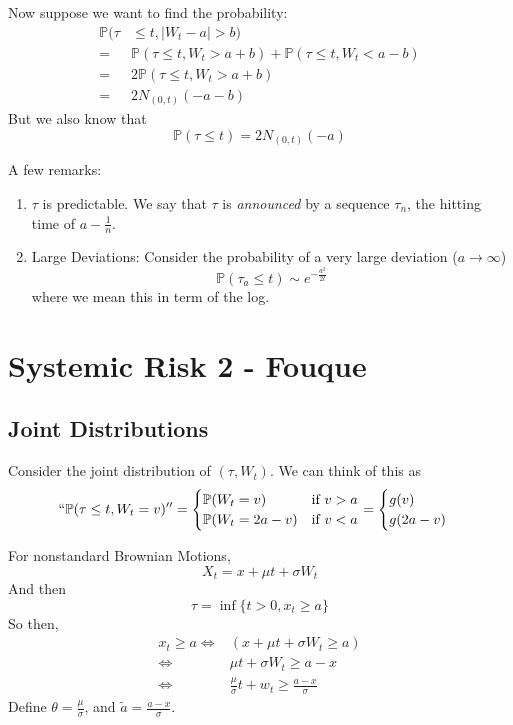 Now suppose we want to find the probability:
\begin{align}
	\mathbb{P}(\tau& \leq t, |W_t-a|> b) \\
	=& \mathbb{P}(\tau \leq t, W_t > a+b) + \mathbb{P}(\tau \leq t, W_t < a-b)\\
	=& 2\mathbb{P}(\tau \leq t, W_t > a+b)\\
	=& 2N_{(0,t)}(-a-b)
\end{align}
But we also know that
\begin{equation}
	\mathbb{P}(\tau \leq t) = 2N_{(0,t)}(-a)
\end{equation}

A few remarks:
\begin{enumerate}
	\item $\tau$ is predictable. We say that $\tau$ is \emph{announced} by a sequence $\tau_n$, the hitting time of $a-\frac1n$.
	\item Large Deviations: Consider the probability of a very large deviation ($a \to \infty$)
	\begin{equation}
		\mathbb{P}(\tau_a \leq t) \sim e^{-\frac{a^2}{2t}}
	\end{equation}
	where we mean this in term of the log.
\end{enumerate}


\chapter{Systemic Risk 2 - Fouque}
\section{Joint Distributions}
Consider the joint distribution of $(\tau,W_t)$. We can think of this as
\begin{equation}
	``\mathbb{P}(\tau\leq t, W_t = v)'' = \begin{cases}
		\mathbb{P}(W_t = v) & \text{if } v > a\\
		\mathbb{P}(W_t=2a-v) & \text{if } v < a
	\end{cases} = \begin{cases}
		g(v)\\
		g(2a-v)
	\end{cases}
\end{equation}

For nonstandard Brownian Motions,
\begin{equation}
	X_t = x + \mu t + \sigma W_t
\end{equation}
And then
\begin{equation}
	\tau = \inf \{ t> 0, x_t \geq a \}
\end{equation}
So then,
\begin{align}
	x_t \geq a  \iff& (x+\mu t + \sigma W_t \geq a)\\
	\iff& \mu t + \sigma W_t \geq a-x\\
	\iff& \frac{\mu}{\sigma} t + w_t \geq \frac{a-x}{\sigma}
\end{align}
Define $\theta=\frac{\mu}{\sigma}$, and $\tilde{a}=\frac{a-x}{\sigma}$.

